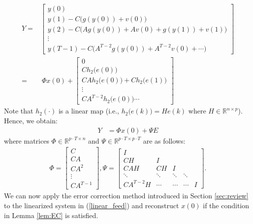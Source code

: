 \begin{equation}
\begin{aligned}
	Y=&\begin{bmatrix} y(0) \\ y(1) - C \big(g(y(0)) + v(0) \big) \\
	y(2) - C \big( A g(y(0)) + Av(0)  + g(y(1))  + v(1) \big)\\ \vdots \\ y(T-1) - C \big(A^{T-2} g(y(0)) + A^{T-2} v(0) + \cdots \big) \end{bmatrix}  \\
	=&~\Phi x(0) +
	\begin{bmatrix} 0 \\ C h_2 \big(e(0) \big) \\ C A h_2 \big(e(0) \big) + C h_2 \big(e(1) \big)  \\ \vdots  \\ C A^{T-2} h_2 \big(e(0) \big)  \cdots \end{bmatrix}
\end{aligned}
\end{equation}
Note that $h_2(\cdot)$ is a linear map (i.e., $h_2 \big(e(k) \big) = H e(k)$ where $H \in \mathbb{R}^{n \times p }$). Hence, we obtain:
\begin{equation}\label{linear_feed}
\begin{aligned}
Y &= \Phi x(0) + \Psi E
\end{aligned}
\end{equation}
where matrices $\Phi \in \mathbb{R}^{p\cdot T \times n}$ and $\Psi \in \mathbb{R}^{p\cdot T \times p\cdot T}$ are as follows:
\begin{equation}
\begin{aligned}
\Phi=\begin{bmatrix} C \\ CA \\ CA^2 \\ \vdots \\ CA^{T-1} \end{bmatrix},
\Psi = \begin{bmatrix} I & & & &   \\
CH & I & & \\
CAH & CH & I & \\
\ddots & \ddots  &  \ddots &  \ddots & \\
CA^{T-2} H & \cdots & \cdots & \cdots & I
\end{bmatrix}.\nonumber
\end{aligned}
\end{equation}
We can now apply the error correction method introduced in Section \ref{sec:review} to the linearized system in (\ref{linear_feed}) and reconstruct $x(0)$ if the condition in Lemma \ref{lem:EC} is satisfied.



